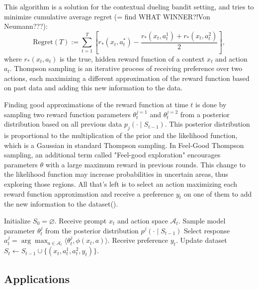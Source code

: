 \documentclass[
  letterpaper,
  DIV=11,
  numbers=noendperiod,
  oneside]{scrreprt}
\theoremstyle{remark}
\begin{document}
This algorithm is a solution for the contextual dueling bandit setting,
and tries to minimize cumulative average regret (= find WHAT WINNER?!Von
Neumann???):
\[\text{Regret}(T) := \sum_{t=1}^{T} \left[ r_{*}(x_t, a_{t}^{*}) - \frac{r_{*}(x_t, a_{t}^{1}) + r_{*}(x_t, a_{t}^{2})}{2} \right],\]
where \(r_{*}(x_t, a_{t})\) is the true, hidden reward function of a
context \(x_t\) and action \(a_t\). Thompson sampling is an iterative
process of receiving preference over two actions, each maximizing a
different approximation of the reward function based on past data and
adding this new information to the data.

Finding good approximations of the reward function at time \(t\) is done
by sampling two reward function parameters \(\theta_t^{j=1}\) and
\(\theta_t^{j=2}\) from a posterior distribution based on all previous
data \(p_j(\cdot \mid S_{t-1})\). This posterior distribution is
proportional to the multiplication of the prior and the likelihood
function, which is a Gaussian in standard Thompson sampling. In
Feel-Good Thompson sampling, an additional term called "Feel-good
exploration" encourages parameters \(\theta\) with a large maximum
reward in previous rounds. This change to the likelihood function may
increase probabilities in uncertain areas, thus exploring those regions.
All that's left is to select an action maximizing each reward function
approximation and receive a preference \(y_t\) on one of them to add the
new information to the dataset().

Initialize \(S_0 = \varnothing\). Receive prompt \(x_t\) and action
space \(\mathcal{A}_t\). Sample model parameter \(\theta_t^j\) from the
posterior distribution \(p^j(\cdot \mid S_{t-1})\) Select response
\(a_t^j = \arg\max_{a \in \mathcal{A}_t} \langle \theta_t^j, \phi(x_t, a) \rangle\).
Receive preference \(y_t\). Update dataset
\(S_t \leftarrow S_{t-1} \cup \{(x_t, a_t^1, a_t^2, y_t)\}\).

\subsection{Applications}\label{applications}
\end{document}
